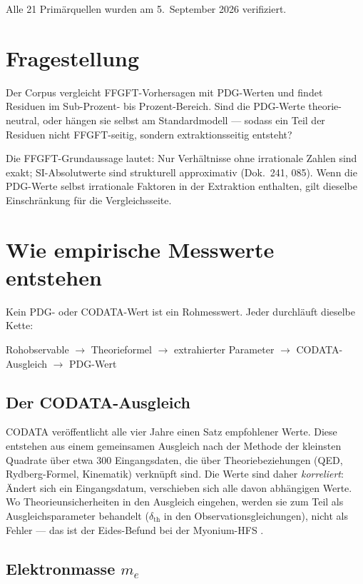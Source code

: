 Alle 21 Primärquellen wurden am 5.~September 2026 verifiziert.

\section{Fragestellung}

Der Corpus vergleicht FFGFT-Vorhersagen mit PDG-Werten und findet Residuen im Sub-Prozent- bis Prozent-Bereich. Sind die PDG-Werte theorie-neutral, oder hängen sie selbst am Standardmodell --- sodass ein Teil der Residuen nicht FFGFT-seitig, sondern extraktionsseitig entsteht?

Die FFGFT-Grundaussage lautet: Nur Verhältnisse ohne irrationale Zahlen sind exakt; SI-Absolutwerte sind strukturell approximativ (Dok.~241, 085). Wenn die PDG-Werte selbst irrationale Faktoren in der Extraktion enthalten, gilt dieselbe Einschränkung für die Vergleichsseite.

\section{Wie empirische Messwerte entstehen}

Kein PDG- oder CODATA-Wert ist ein Rohmesswert. Jeder durchläuft dieselbe Kette:
\begin{center}
Rohobservable $\to$ Theorieformel $\to$ extrahierter Parameter $\to$ CODATA-Ausgleich $\to$ PDG-Wert
\end{center}

\subsection{Der CODATA-Ausgleich}

CODATA veröffentlicht alle vier Jahre einen Satz empfohlener Werte. Diese entstehen aus einem gemeinsamen Ausgleich nach der Methode der kleinsten Quadrate über etwa 300 Eingangsdaten, die über Theoriebeziehungen (QED, Rydberg-Formel, Kinematik) verknüpft sind. Die Werte sind daher \emph{korreliert}: Ändert sich ein Eingangsdatum, verschieben sich alle davon abhängigen Werte. Wo Theorieunsicherheiten in den Ausgleich eingehen, werden sie zum Teil als Ausgleichsparameter behandelt ($\delta_\text{th}$ in den Observationsgleichungen), nicht als Fehler --- das ist der Eides-Befund bei der Myonium-HFS \QM.

\subsection{Elektronmasse $m_e$}

